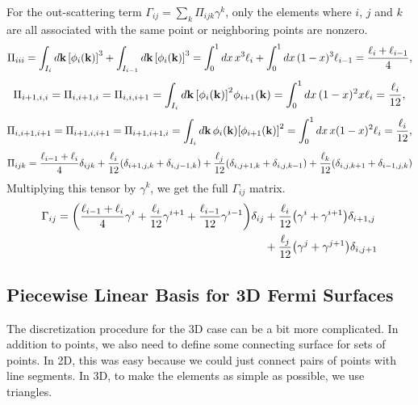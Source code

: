 \documentclass[12pt]{article}
\begin{document}
For the out-scattering term $\Gamma_{ij}=\sum_k\Pi_{ijk}\gamma^k$, only the elements where $i$, $j$ and $k$ are all
associated with the same point or neighboring points are nonzero.
\begin{equation}
    \Pi_{iii} = \int_{I_i} \dd{\vb{k}} \qty[\phi_i(\vb{k})]^3 + \int_{I_{i-1}}
        \dd{\vb{k}} \qty[\phi_i(\vb{k})]^3
    = \int_0^1 \dd{x} x^3 \ell_i + \int_0^1 \dd{x} (1-x)^3 \ell_{i-1}
    = \frac{\ell_i + \ell_{i-1}}{4},
\end{equation}
\begin{equation}
    \Pi_{i+1,i,i} = \Pi_{i,i+1,i} = \Pi_{i,i,i+1} = \int_{I_i} \dd{\vb{k}}
    \qty[\phi_i(\vb{k})]^2\phi_{i+1}(\vb{k}) = \int_0^1 \dd{x} (1-x)^2 x \ell_i = \frac{\ell_i}{12},
\end{equation}
\begin{equation}
    \Pi_{i,i+1,i+1} = \Pi_{i+1,i,i+1} = \Pi_{i+1,i+1,i} = \int_{I_i} \dd{\vb{k}}
    \phi_i(\vb{k})\qty[\phi_{i+1}(\vb{k})]^2 = \int_0^1 \dd{x} x(1-x)^2 \ell_i = \frac{\ell_i}{12},
\end{equation}
\begin{equation}
    \Pi_{ijk} = \frac{\ell_{i-1} + \ell_i}{4}\delta_{ijk}
    + \frac{\ell_i}{12}\qty(\delta_{i+1,j,k} + \delta_{i,j-1,k})
    + \frac{\ell_j}{12}\qty(\delta_{i,j+1,k} + \delta_{i,j,k-1})
    + \frac{\ell_k}{12}\qty(\delta_{i,j,k+1} + \delta_{i-1,j,k})
\end{equation}
Multiplying this tensor by $\gamma^k$, we get the full $\Gamma_{ij}$ matrix.
\begin{equation}
\begin{aligned}
    \Gamma_{ij} = \qty(\frac{\ell_{i-1} + \ell_i}{4}\gamma^i + \frac{\ell_i}{12}\gamma^{i+1}
        + \frac{\ell_{i-1}}{12}\gamma^{i-1})\delta_{ij}
    &+ \frac{\ell_i}{12}\qty(\gamma^i + \gamma^{i+1})\delta_{i+1,j} \\
    &+ \frac{\ell_j}{12}\qty(\gamma^j + \gamma^{j+1})\delta_{i,j+1}
\end{aligned}
\end{equation}

\subsection{Piecewise Linear Basis for 3D Fermi Surfaces}
The discretization procedure for the 3D case can be a bit more complicated. In addition to points,
we also need to define some connecting surface for sets of points. In 2D, this was easy because we
could just connect pairs of points with line segments. In 3D, to make the elements as simple as
possible, we use triangles.
\end{document}
